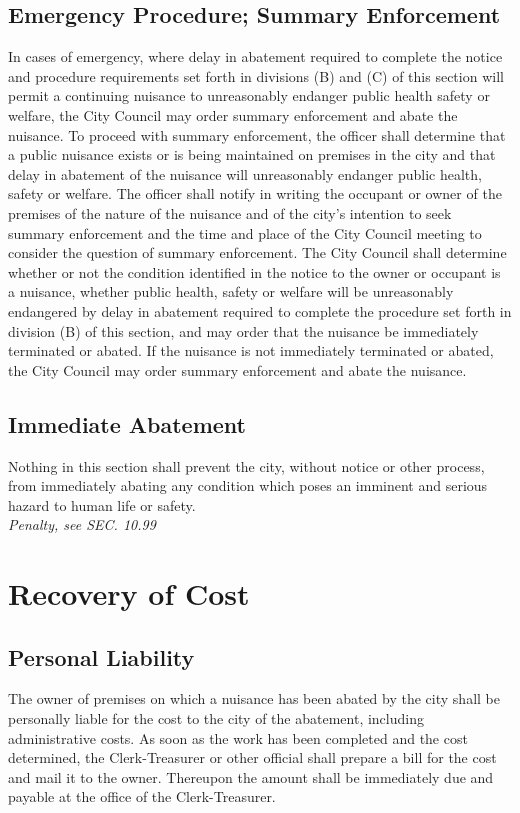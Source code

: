 \subsection{Emergency Procedure; Summary Enforcement}
In cases of emergency, where delay in abatement required to complete the notice and procedure requirements set forth in divisions (B) and (C) of this section will permit a continuing nuisance to unreasonably endanger public health safety or welfare, the City Council may order summary enforcement and abate the nuisance.  To proceed with summary enforcement, the officer shall determine that a public nuisance exists or is being maintained on premises in the city and that delay in abatement of the nuisance will unreasonably endanger public health, safety or welfare.  The officer shall notify in writing the occupant or owner of the premises of the nature of the nuisance and of the city’s intention to seek summary enforcement and the time and place of the City Council meeting to consider the question of summary enforcement.  The City Council shall determine whether or not the condition identified in the notice to the owner or occupant is a nuisance, whether public health, safety or welfare will be unreasonably endangered by delay in abatement required to complete the procedure set forth in division (B) of this section, and may order that the nuisance be immediately terminated or abated.  If the nuisance is not immediately terminated or abated, the City Council may order summary enforcement and abate the nuisance.
\subsection{Immediate Abatement}
Nothing in this section shall prevent the city, without notice or other process, from immediately abating any condition which poses an imminent and serious hazard to human life or safety.\\
\emph{Penalty, see SEC. 10.99}
\section{Recovery of Cost}
\subsection{Personal Liability}
The owner of premises on which a nuisance has been abated by the city shall be personally liable for the cost to the city of the abatement, including administrative costs.  As soon as the work has been completed and the cost determined, the Clerk-Treasurer or other official shall prepare a bill for the cost and mail it to the owner.  Thereupon the amount shall be immediately due and payable at the office of the Clerk-Treasurer.
